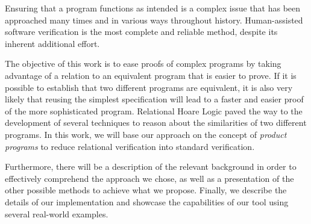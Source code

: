 

Ensuring that a program functions as intended is a complex issue that has been approached many times and in various ways throughout history.
Human-assisted software verification is the most complete and reliable method, despite its inherent additional effort.

The objective of this work is to ease proofs of complex programs by taking advantage of a relation to an equivalent program that is easier to prove.
If it is possible to establish that two different programs are equivalent, it is also very likely that reusing the simplest specification will lead to a faster and easier proof of the more sophisticated program.
Relational Hoare Logic paved the way to the development of several techniques to reason about the similarities of two different programs.
In this work, we will base our approach on the concept of \emph{product programs} to reduce relational verification into standard verification.

Furthermore, there will be a description of the relevant background in order to effectively comprehend the approach we chose, as well as a presentation of the other possible methods to achieve what we propose.
Finally, we describe the details of our implementation and showcase the capabilities of our tool using several real-world examples.


